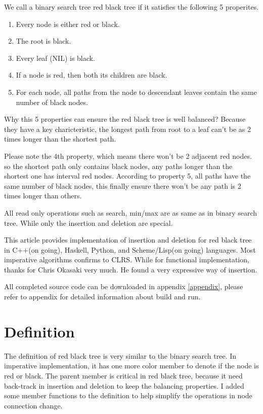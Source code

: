 \documentclass{article}
\begin{document}
We call a binary search tree red black tree if it satisfies the following 5 properites\cite{CLRS}.

\begin{enumerate}
\item Every node is either red or black.
\item The root is black.
\item Every leaf (NIL) is black.
\item If a node is red, then both its children are black.
\item For each node, all paths from the node to descendant leaves contain the same number of black nodes.
\end{enumerate}

Why this 5 properties can ensure the red black tree is well balanced? Because they have a key charicteristic, the longest path from root to a leaf can't be as 2 times longer than the shortest path.

Please note the 4th property, which means there won't be 2 adjacent red nodes. so the shortest path only contains black nodes, any paths longer than the shortest one has interval red nodes. According to property 5, all paths have the same number of black nodes, this finally ensure there won't be any path is 2 times longer than others\cite{wiki}.

All read only operations such as search, min/max are as same as in binary search tree. While only the insertion and deletion are special.

This article provides implementation of insertion and deletion for red black tree in C++(on going), Haskell, Python, and Scheme/Lisp(on going) languages. Most imperative algorithms confirms to CLRS\cite{CLRS}. While for functional implementation, thanks for Chris Okasaki very much. He found a very expressive way\cite{okasaki} of insertion.

All completed source code can be downloaded in appendix \ref{appendix}, please refer to appendix for detailed information about build and run.

\section{Definition}
\label{definition}

The definition of red black tree is very similar to the binary search tree.
In imperative implementation, it has one more color member to denote if the node is red or black. The parent member is critical in red black tree, because
it need back-track in insertion and deletion to keep the balancing properties.
I added some member functions to the definition to help simplify the operations
in node connection change.
\end{document}

